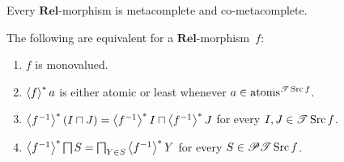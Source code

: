 \begin{cor}
Every $\mathbf{Rel}$-morphism is metacomplete and co-metacomplete.\end{cor}
\begin{prop}
\label{rel-mono}The following are equivalent for a $\mathbf{Rel}$-morphism~$f$:
\begin{enumerate}
\item \label{rel-mono-mono}$f$ is monovalued.
\item \label{rel-mono-atom}$\left\langle f\right\rangle ^{\ast}a$ is either atomic or least whenever
$a\in\operatorname{atoms}^{\mathscr{T}\operatorname{Src} f}$.
\item \label{rel-mono-bin}$\left\langle f^{-1}\right\rangle ^{\ast}(I\sqcap J)=\left\langle f^{-1}\right\rangle ^{\ast}I\sqcap\left\langle f^{-1}\right\rangle ^{\ast}J$
for every $I,J\in\mathscr{T}\operatorname{Src} f$.
\item \label{rel-mono-meet}$\left\langle f^{-1}\right\rangle ^{\ast}\bigsqcap S=\bigsqcap_{Y\in S}\left\langle f^{-1}\right\rangle ^{\ast}Y$
for every $S\in\mathscr{P}\mathscr{T}\operatorname{Src} f$.
\end{enumerate}
\end{prop}
